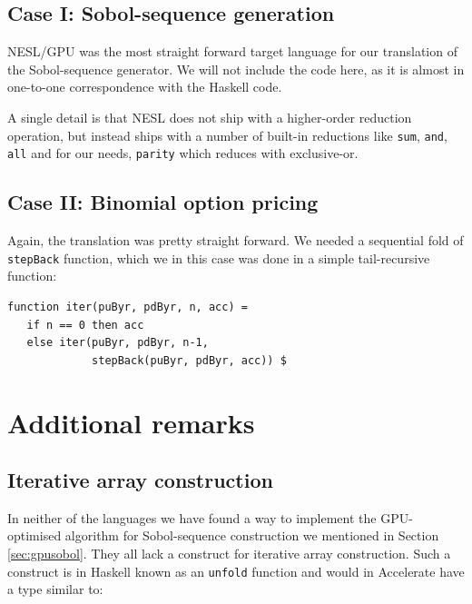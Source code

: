 \documentclass[preprint]{sigplanconf}
\begin{document}
\subsection{Case I: Sobol-sequence generation}
NESL/GPU was the most straight forward target language for our
translation of the Sobol-sequence generator. We will not include the
code here, as it is almost in one-to-one correspondence with the
Haskell code. 

A single detail is that NESL does not ship with a higher-order
reduction operation, but instead ships with a number of built-in
reductions like \verb|sum|, \verb|and|, \verb|all| and for our needs,
\verb|parity| which reduces with exclusive-or.

\subsection{Case II: Binomial option pricing}
Again, the translation was pretty straight forward. We needed a
sequential fold of \verb|stepBack| function, which we in this case was
done in a simple tail-recursive function:
\begin{verbatim}
function iter(puByr, pdByr, n, acc) =
   if n == 0 then acc
   else iter(puByr, pdByr, n-1, 
             stepBack(puByr, pdByr, acc)) $
\end{verbatim}


\section{Additional remarks}
\subsection{Iterative array construction}
\label{sec:itercons}
In neither of the languages we have found a way to implement the
GPU-optimised algorithm for Sobol-sequence construction we mentioned
in Section \ref{sec:gpusobol}. They all lack a construct for iterative
array construction. Such a construct is in Haskell known as
an \verb|unfold| function and would in Accelerate have a type similar to:
\end{document}
